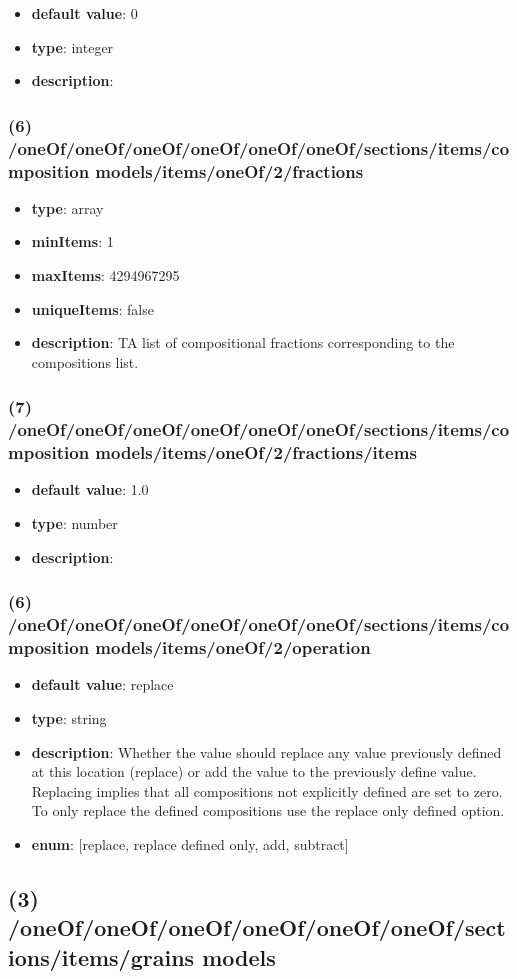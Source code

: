 \begin{itemize}[leftmargin=7em]\item {\bf default value}: 0
\item {\bf type}: integer
\item {\bf description}: 
\end{itemize}\subsubsection{(6) /oneOf/oneOf/oneOf/oneOf/oneOf/oneOf/sections/items/composition models/items/oneOf/2/fractions}
\begin{itemize}[leftmargin=6em]\item {\bf type}: array
\item {\bf minItems}: 1
\item {\bf maxItems}: 4294967295
\item {\bf uniqueItems}: false
\item {\bf description}: TA list of compositional fractions corresponding to the compositions list.
\end{itemize}\subsubsection{(7) /oneOf/oneOf/oneOf/oneOf/oneOf/oneOf/sections/items/composition models/items/oneOf/2/fractions/items}
\begin{itemize}[leftmargin=7em]\item {\bf default value}: 1.0
\item {\bf type}: number
\item {\bf description}: 
\end{itemize}\subsubsection{(6) /oneOf/oneOf/oneOf/oneOf/oneOf/oneOf/sections/items/composition models/items/oneOf/2/operation}
\begin{itemize}[leftmargin=6em]\item {\bf default value}: replace
\item {\bf type}: string
\item {\bf description}: Whether the value should replace any value previously defined at this location (replace) or add the value to the previously define value. Replacing implies that all compositions not explicitly defined are set to zero. To only replace the defined compositions use the replace only defined option.
\item {\bf enum}: [replace, replace defined only, add, subtract]\end{itemize}\subsection{(3) /oneOf/oneOf/oneOf/oneOf/oneOf/oneOf/sections/items/grains models}
